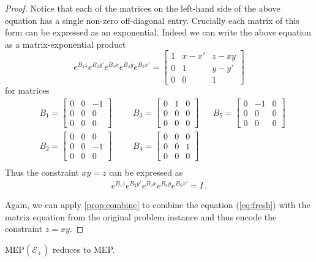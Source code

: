 \documentclass[format=acmsmall, review=false, screen=true]{acmart}
\begin{document}
\begin{proof}
Notice that each of the matrices on the left-hand side of the above
equation has a single non-zero off-diagonal entry.  Crucially each
matrix of this form can be expressed as an exponential.  Indeed we can
write the above equation as a matrix-exponential product
\[ e^{B_1z} e^{B_2y'} e^{B_3x} e^{B_4y} e^{B_5x'} = \begin{bmatrix}1&x-x'&z-xy\\0&1&y-y'\\0&0&1\end{bmatrix} \]
for matrices
\begin{align*}
&B_1=\begin{bmatrix}0&0&-1\\0&0&0\\0&0&0\end{bmatrix} &&
&B_3=\begin{bmatrix}0&1&0\\0&0&0\\0&0&0\end{bmatrix} &&
B_5=\begin{bmatrix}0&-1&0\\0&0&0\\0&0&0\end{bmatrix} \\[10pt]
&B_2=\begin{bmatrix}0&0&0\\0&0&-1\\0&0&0\end{bmatrix} &&
&B_4=\begin{bmatrix}0&0&0\\0&0&1\\0&0&0\end{bmatrix} \\
\end{align*}
Thus the constraint $xy=z$ can be expressed as
\begin{gather}
e^{B_1z} e^{B_2y'} e^{B_3x} e^{B_4y} e^{B_5x'} = I \, .
\label{eq:fresh}
\end{gather}

Again, we can apply \cref{prop:combine} to combine the
equation (\ref{eq:fresh}) with the matrix equation from the original
problem instance and thus encode the constraint $z=xy$.
\end{proof}

\begin{proposition}
  MEP$(\mathcal{E}_{+})$ reduces to MEP\@.
\label{lem:plus}
\end{proposition}
\end{document}
